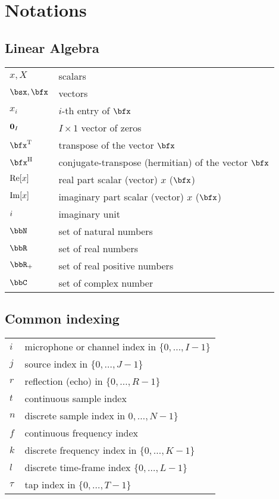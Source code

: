 \chapter*{Notations}\label{ch:notation}


\section*{Linear Algebra}
\begin{table}[H]
    \begin{tabular}{ll}
        $x, X$     & scalars      \\
        $\bsx, \bfx$  & vectors      \\
        $x_i$   & $i$-th entry of $\bfx$ \\
        $\mathbf{0}_I$ & $I\times1$ vector of zeros\\
        $\ktranspose{\bfx}$   & transpose of the vector $\bfx$ \\
        $\khermitian{\bfx}$   & conjugate-transpose (hermitian) of the vector $\bfx$ \\
        $\operatorname{Re}[x]$ & real part scalar (vector) $x$ ($\bfx$) \\
        $\operatorname{Im}[x]$ & imaginary part scalar (vector) $x$ ($\bfx$) \\
        ${i}$  & imaginary unit \\
        $\bbN$    & set of natural numbers \\
        $\bbR$    & set of real numbers \\
        $\bbR_{+}$  & set of real positive numbers \\
        $\bbC$      & set of complex number \\
    \end{tabular}
\end{table}

\section*{Common indexing}
\begin{table}[H]
    \begin{tabular}{ll}
        $i$     & microphone or channel index in $\{0, \dots, I-1\}$      \\
        $j$     & source index in $\{0, \dots, J-1\}$      \\
        $r$     & reflection (echo) in $\{0, \dots, R-1\}$      \\
        $t$     & continuous sample index\\
        $n$     & discrete sample index in $0, \dots, N-1\}$ \\
        $f$     & continuous frequency index \\
        $k$     & discrete frequency index in $\{0, \dots, K-1\}$ \\
        $l$     & discrete time-frame index $\{0, \dots, L-1\}$\\
        $\tau$  & tap index in $\{0, \dots, T-1\}$\\
    \end{tabular}
\end{table}

